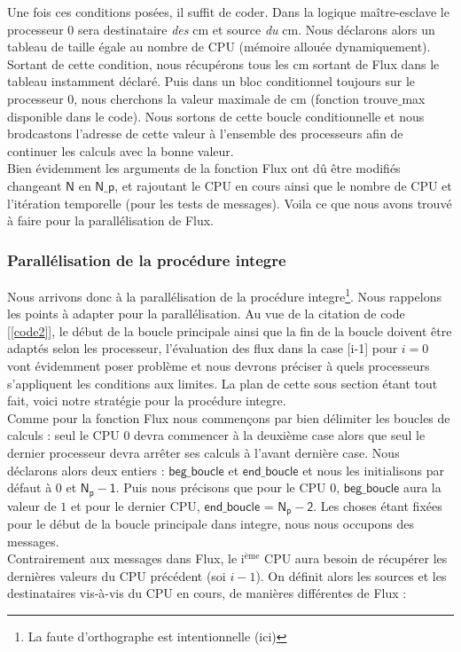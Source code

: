 \documentclass[french]{article}
\newcommand{\choco}{\color{choco}}
\newcommand{\bk}{\color{black}}
\newcommand{\vav}{vis-à-vis}
\newcommand{\iieme}{i$^{\text{ème}}$}
\begin{document}
Une fois ces conditions posées, il suffit de coder. Dans la logique maître-esclave le processeur 0 sera destinataire \textit{des} cm et source \textit{du} cm. Nous déclarons alors un tableau de taille égale au nombre de CPU (mémoire allouée dynamiquement). Sortant de cette condition, nous récupérons tous les cm sortant de Flux dans le tableau instamment déclaré. Puis dans un bloc conditionnel toujours sur le processeur 0, nous cherchons la valeur maximale de cm (fonction trouve$\_$max disponible dans le code). Nous sortons de cette boucle conditionnelle et nous brodcastons l'adresse de cette valeur à l'ensemble des processeurs afin de continuer les calculs avec la bonne valeur.\\
 Bien évidemment les arguments de la fonction Flux ont dû être modifiés changeant $\mathsf{N}$ en $\mathsf{N\_ p}$, et rajoutant le CPU en cours ainsi que le nombre de CPU et l'itération temporelle (pour les tests de messages). Voila ce que nous avons trouvé à faire pour la parallélisation de Flux.

\choco \subsubsection*{Parallélisation de la procédure integre} \bk
Nous arrivons donc à la parallélisation de la procédure integre\footnote{La faute d'orthographe est intentionnelle (ici)}. Nous rappelons les points à adapter pour la parallélisation. Au vue de la citation de code [\ref{code2}], le début de la boucle principale ainsi que la fin de la boucle doivent être adaptés selon les processeur, l'évaluation des flux dans la case [i-1] pour $i=0$ vont évidemment poser problème et nous devrons préciser à quels processeurs s'appliquent les conditions aux limites. La plan de cette sous section étant tout fait, voici notre stratégie pour la procédure integre.\\
 
 \noindent Comme pour la fonction Flux nous commençons par bien délimiter les boucles de calculs : seul le CPU 0 devra commencer à la deuxième case alors que seul le dernier processeur devra  arrêter ses calculs à l'avant dernière case. Nous déclarons alors deux entiers : $\mathsf{beg\_ boucle}$ et $\mathsf{end\_ boucle}$ et nous les initialisons par défaut à $0$ et $\mathsf{N_p -1}$. Puis nous précisons que pour le CPU 0,   $\mathsf{beg\_ boucle}$ aura la valeur de $1$ et pour le dernier CPU, $\mathsf{end\_ boucle}$ = $\mathsf{N_p -2}$. Les choses étant fixées pour le début de la boucle principale dans integre, nous nous occupons des messages. \\
 Contrairement aux messages dans Flux, le \iieme $ $ CPU aura besoin de récupérer les dernières valeurs du CPU précédent (soi $i - 1$). On définit alors les sources et les destinataires \vav $ $ du CPU en cours, de manières différentes de Flux : 
\end{document}
